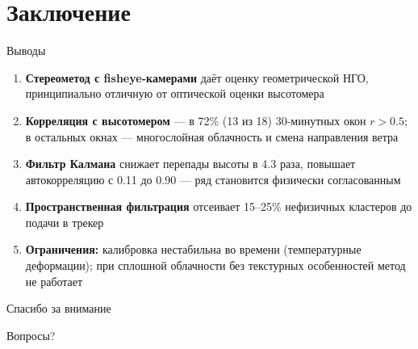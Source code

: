 \documentclass[11pt,aspectratio=169]{beamer}
\begin{document}

\section{Заключение}

\begin{frame}{Выводы}
\begin{enumerate}
	\item \textbf{Стереометод с fisheye-камерами} даёт оценку геометрической НГО, принципиально отличную от оптической оценки высотомера
	\item \textbf{Корреляция с высотомером} --- в 72\% (13 из 18) 30-минутных окон $r > 0.5$; в остальных окнах --- многослойная облачность и смена направления ветра
	\item \textbf{Фильтр Калмана} снижает перепады высоты в 4.3 раза, повышает автокорреляцию с 0.11 до 0.90 --- ряд становится физически согласованным
	\item \textbf{Пространственная фильтрация} отсеивает 15--25\% нефизичных кластеров до подачи в трекер
	\item \textbf{Ограничения:} калибровка нестабильна во времени (температурные деформации); при сплошной облачности без текстурных особенностей метод не работает
\end{enumerate}
\end{frame}

\begin{frame}{Спасибо за внимание}
\begin{center}
\Large
Вопросы?
\end{center}
\end{frame}
\end{document}
